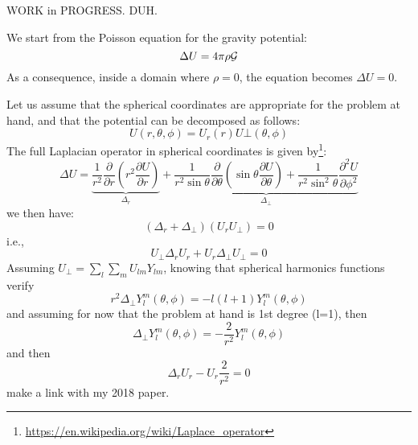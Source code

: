 WORK in PROGRESS. DUH.

We start from the Poisson equation for the gravity potential:
\begin{equation}
\Delta U = 4\pi \rho {\cal G}
\end{equation}
As a consequence, inside a domain where $\rho=0$, the equation becomes $\Delta U=0$.

Let us assume that the spherical coordinates are appropriate for the problem at hand, and that 
the potential can be decomposed as follows:
\[
U(r,\theta,\phi) = U_r(r) U\bot(\theta,\phi)
\]
The full Laplacian operator in spherical coordinates is given 
by\footnote{\url{https://en.wikipedia.org/wiki/Laplace_operator}}:
\[
\Delta U 
= 
\underbrace{\frac{1}{r^2} \frac{\partial }{\partial r}\left(r^2 \frac{\partial U}{\partial r}\right)}_{\Delta_r}
+
\underbrace{
\frac{1}{r^2 \sin\theta} \frac{\partial }{\partial \theta} \left(\sin\theta \frac{\partial U}{\partial \theta} \right) 
+
\frac{1}{r^2 \sin^2\theta} \frac{\partial^2 U }{\partial \phi^2}
}_{\Delta_\bot}
\]
we then have:
\[
(\Delta_r + \Delta_\bot)(U_r U_\bot)=0
\]
i.e., 
\[
U_\bot \Delta_r U_r + U_r \Delta_\bot U_\bot=0
\]
Assuming $U_\bot=\sum_l\sum_m U_{lm}Y_{lm}$, knowing that spherical 
harmonics functions verify
\[
r^2 \Delta_\bot Y_l^m(\theta,\phi) = -l(l+1) Y_l^m (\theta,\phi)
\]
and assuming for now that the problem at hand is 1st degree (l=1), then 
\[
\Delta_\bot Y_l^m(\theta,\phi) = -\frac{2}{r^2} Y_l^m (\theta,\phi)
\]
and then
\[
\Delta_r U_r - U_r \frac{2}{r^2}=0
\]
make a link with my 2018 paper. 
\newpage

